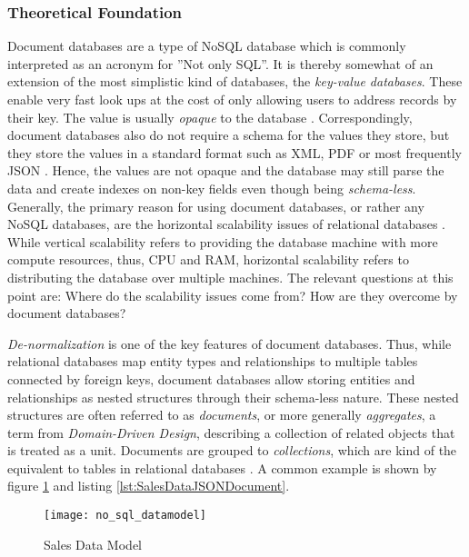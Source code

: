 \subsubsection{Theoretical Foundation}
Document databases are a type of NoSQL database which is commonly interpreted as an acronym for ''Not only SQL''. It is thereby somewhat of an extension of the most simplistic kind of databases, the \emph{key-value databases}. These enable very fast look ups at the cost of only allowing users to address records by their key. The value is usually \emph{opaque} to the database \cite{NoSQL}. Correspondingly, document databases also do not require a schema for the values they store, but they store the values in a standard format such as XML, PDF or most frequently JSON \cite{NoSQL}. Hence, the values are not opaque and the database may still parse the data and create indexes on non-key fields even though being \emph{schema-less}.\\

Generally, the primary reason for using document databases, or rather any NoSQL databases, are the horizontal scalability issues of relational databases \cite{NoSQL}. While vertical scalability refers to providing the database machine with more compute resources, thus, CPU and RAM, horizontal scalability refers to distributing the database over multiple machines. The relevant questions at this point are: Where do the scalability issues come from? How are they overcome by document databases?\par
\emph{De-normalization} is one of the key features of document databases. Thus, while relational databases map entity types and relationships to multiple tables connected by foreign keys, document databases allow storing entities and relationships as nested structures through their schema-less nature. These nested structures are often referred to as \emph{documents}, or more generally \emph{aggregates}, a term from \emph{Domain-Driven Design}, describing a collection of related objects that is treated as a unit. Documents are grouped to \emph{collections}, which are kind of the equivalent to tables in relational databases \cite{NoSQLDistilled}. A common example is shown by figure \ref{fig:NoSQLDataModel} and listing \ref{lst:SalesDataJSONDocument}.\\

\begin{figure}[H]
	\centering
	\texttt{[image: no\_sql\_datamodel]}
	\caption[Sales Data Model]{Sales Data Model }
	\label{fig:NoSQLDataModel}
\end{figure}

